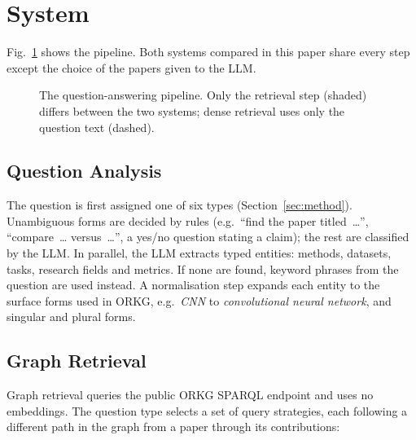 
\section{System}
\label{sec:system}

Fig.~\ref{fig:pipeline} shows the pipeline. Both systems compared in this paper
share every step except the choice of the papers given to the LLM.

\begin{figure}[t]
\centering

\caption{The question-answering pipeline. Only the retrieval step (shaded)
differs between the two systems; dense retrieval uses only the question text
(dashed).}
\label{fig:pipeline}
\end{figure}

\subsection{Question Analysis}

The question is first assigned one of six types (Section~\ref{sec:method}).
Unambiguous forms are decided by rules (e.g.\ ``find the paper titled~\ldots'',
``compare~\ldots{} versus~\ldots'', a yes/no question stating a claim); the rest
are classified by the LLM. In parallel, the LLM extracts typed entities:
methods, datasets, tasks, research fields and metrics. If none are found,
keyword phrases from the question are used instead. A normalisation step
expands each entity to the surface forms used in ORKG, e.g.\ \emph{CNN} to
\emph{convolutional neural network}, and singular and plural forms.

\subsection{Graph Retrieval}

Graph retrieval queries the public ORKG SPARQL endpoint and uses no embeddings.
The question type selects a set of query strategies, each following a
different path in the graph from a paper through its contributions:

